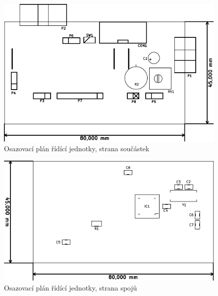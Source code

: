 \begin{figure}[H]
	\centering
	\includegraphics[width=170mm]{img/cu/os_f.pdf}
	\caption{Osazovací plán řídící jednotky, strana součástek}    		
\end{figure}

\begin{figure}[H]
	\centering
	\includegraphics[width=165mm]{img/cu/os_b.pdf}
	\caption{Osazovací plán řídící jednotky, strana spojů}    		
\end{figure}

